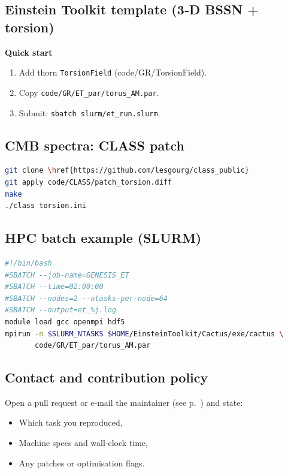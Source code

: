 \documentclass{article}
\begin{document}
\subsection*{Einstein Toolkit template (3‑D BSSN + torsion)}
\textbf{Quick start}
\begin{enumerate}[nosep]
\item Add thorn \texttt{TorsionField} (code/GR/TorsionField).  
\item Copy \texttt{code/GR/ET\_par/torus\_AM.par}.  
\item Submit: \texttt{sbatch slurm/et\_run.slurm}.
\end{enumerate}

\subsection*{CMB spectra: CLASS patch}
\begin{lstlisting}[language=bash,basicstyle=\ttfamily\small]
git clone \href{https://github.com/lesgourg/class_public}
git apply code/CLASS/patch_torsion.diff
make
./class torsion.ini
\end{lstlisting}

\subsection*{HPC batch example (SLURM)}
\begin{lstlisting}[language=bash,basicstyle=\ttfamily\small]
#!/bin/bash
#SBATCH --job-name=GENESIS_ET
#SBATCH --time=02:00:00
#SBATCH --nodes=2 --ntasks-per-node=64
#SBATCH --output=et_%j.log
module load gcc openmpi hdf5
mpirun -n $SLURM_NTASKS $HOME/EinsteinToolkit/Cactus/exe/cactus \
       code/GR/ET_par/torus_AM.par
\end{lstlisting}

\subsection*{Contact and contribution policy}
Open a pull request or e‑mail the maintainer (see p.~\pageref{sec:torsion_quant})
and state:
\begin{itemize}[nosep]
\item Which task you reproduced,
\item Machine specs and wall‑clock time,
\item Any patches or optimisation flags.
\end{itemize}
\end{document}
